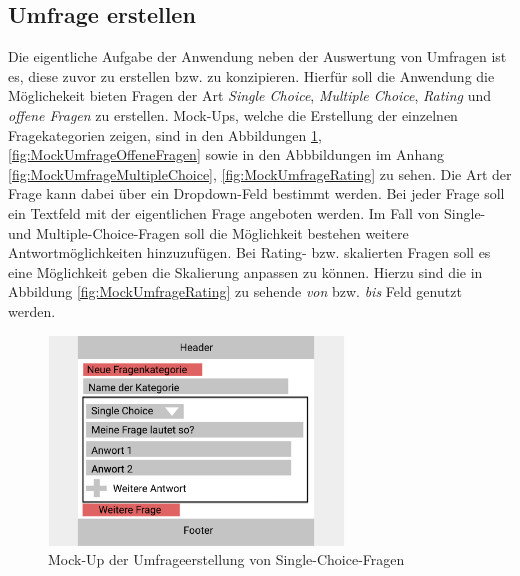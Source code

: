 \subsection{Umfrage erstellen}
\label{ssec:konzept:client:umfrage_erstellen}

Die eigentliche Aufgabe der Anwendung neben der Auswertung von Umfragen ist es, diese zuvor zu erstellen bzw. zu konzipieren.
Hierfür soll die Anwendung die Möglichekeit bieten Fragen der Art \emph{Single Choice}, \emph{Multiple Choice}, \emph{Rating} und \emph{offene Fragen} zu erstellen.
Mock-Ups, welche die Erstellung der einzelnen Fragekategorien zeigen, sind in den Abbildungen \ref{fig:MockUmfrageSingleChoice}, \ref{fig:MockUmfrageOffeneFragen} sowie in den Abbbildungen im Anhang \ref{fig:MockUmfrageMultipleChoice}, \ref{fig:MockUmfrageRating} zu sehen.
Die Art der Frage kann dabei über ein Dropdown-Feld bestimmt werden.
Bei jeder Frage soll ein Textfeld mit der eigentlichen Frage angeboten werden.
Im Fall von Single- und Multiple-Choice-Fragen soll die Möglichkeit bestehen weitere Antwortmöglichkeiten hinzuzufügen.
Bei Rating- bzw. skalierten Fragen soll es eine Möglichkeit geben die Skalierung anpassen zu können.
Hierzu sind die in Abbildung \ref{fig:MockUmfrageRating} zu sehende \emph{von} bzw. \emph{bis} Feld genutzt werden.

\begin{figure}[h]
	\centering
	\includegraphics[width=0.7\textwidth]{img/konzeption/client/umfrage_erstellen_single_choice}
	\captionsetup{justification=centering, format=plain}
	\caption[Mock-Up der Umfrageerstellung von Single-Choice-Fragen]{Mock-Up der Umfrageerstellung von Single-Choice-Fragen\\\figma}
	\label{fig:MockUmfrageSingleChoice}
\end{figure}

